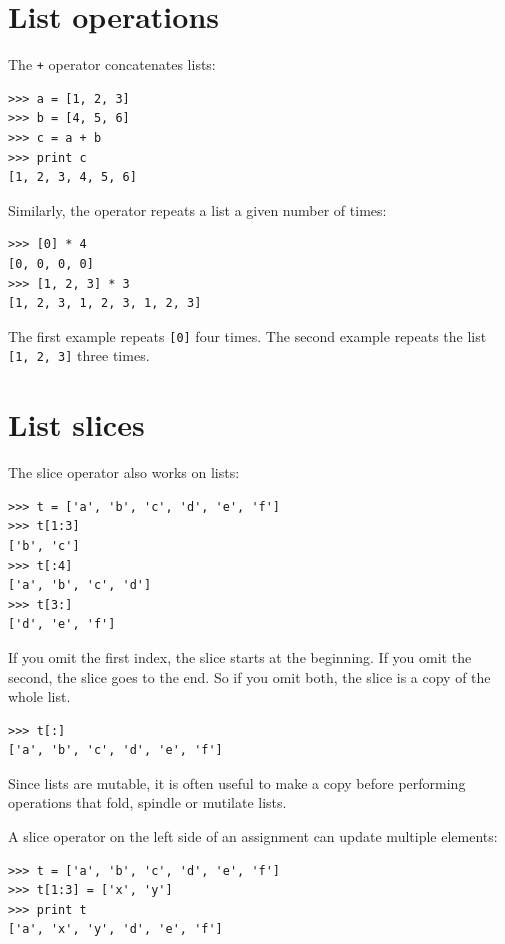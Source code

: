 \documentclass[10pt]{book}
\begin{document}
\section{List operations}

The {\tt +} operator concatenates lists:

\begin{verbatim}
>>> a = [1, 2, 3]
>>> b = [4, 5, 6]
>>> c = a + b
>>> print c
[1, 2, 3, 4, 5, 6]
\end{verbatim}
%
Similarly, the {\tt *} operator repeats a list a given number of times:

\begin{verbatim}
>>> [0] * 4
[0, 0, 0, 0]
>>> [1, 2, 3] * 3
[1, 2, 3, 1, 2, 3, 1, 2, 3]
\end{verbatim}
%
The first example repeats {\tt [0]} four times.  The second example
repeats the list {\tt [1, 2, 3]} three times.


\section{List slices}

The slice operator also works on lists:

\begin{verbatim}
>>> t = ['a', 'b', 'c', 'd', 'e', 'f']
>>> t[1:3]
['b', 'c']
>>> t[:4]
['a', 'b', 'c', 'd']
>>> t[3:]
['d', 'e', 'f']
\end{verbatim}
%
If you omit the first index, the slice starts at the beginning.
If you omit the second, the slice goes to the end.  So if you
omit both, the slice is a copy of the whole list.

\begin{verbatim}
>>> t[:]
['a', 'b', 'c', 'd', 'e', 'f']
\end{verbatim}
%
Since lists are mutable, it is often useful to make a copy
before performing operations that fold, spindle or mutilate
lists.

A slice operator on the left side of an assignment
can update multiple elements:

\begin{verbatim}
>>> t = ['a', 'b', 'c', 'd', 'e', 'f']
>>> t[1:3] = ['x', 'y']
>>> print t
['a', 'x', 'y', 'd', 'e', 'f']
\end{verbatim}
%
\end{document}
